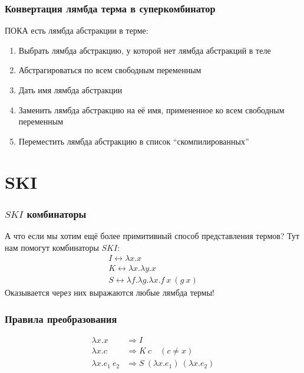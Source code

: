 \documentclass[aspectratio=169]{beamer}
\begin{document}
\begin{frame}
    \frametitle{Конвертация лямбда терма в суперкомбинатор}

    ПОКА есть лямбда абстракции в терме:
    \begin{enumerate}
        \item Выбрать лямбда абстракцию, у которой нет лямбда абстракций в теле
        \item Абстрагироваться по всем свободным переменным
        \item Дать имя лямбда абстракции
        \item Заменить лямбда абстракцию на её имя, примененное ко всем свободным переменным
        \item Переместить лямбда абстракцию в список \enquote{скомпилированных}
    \end{enumerate}

\end{frame}

\section{SKI}

\begin{frame}
    \frametitle{$SKI$ комбинаторы}

    А что если мы хотим ещё более примитивный способ представления термов?
    Тут нам помогут комбинаторы $SKI$:
    \begin{gather*}
        I \leftrightarrow \lambda x. x \\
        K \leftrightarrow \lambda x. \lambda y. x \\
        S \leftrightarrow \lambda f. \lambda g. \lambda x. f\ x\ (g\ x)
    \end{gather*}
    Оказывается через них выражаются любые лямбда термы!
\end{frame}

\begin{frame}
    \frametitle{Правила преобразования}

    \begin{align*}
        \lambda x.x        & \Rightarrow I                                    \\
        \lambda x.c        & \Rightarrow K\ c\quad (c \neq x)                 \\
        \lambda x.e_1\ e_2 & \Rightarrow S\ (\lambda x.e_1)\ (\lambda x. e_2)
    \end{align*}

\end{frame}
\end{document}
